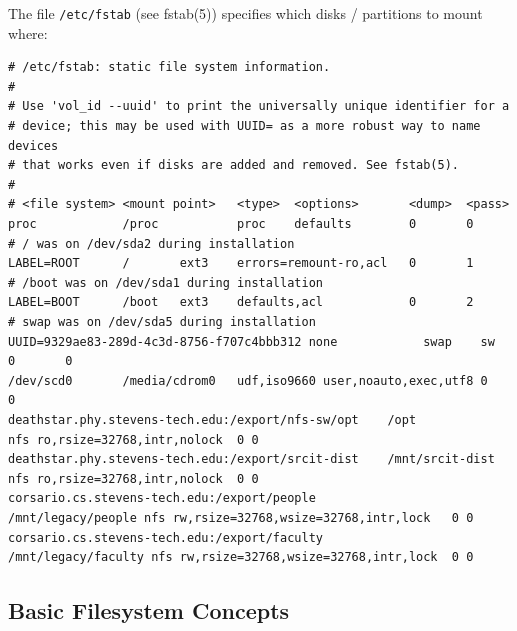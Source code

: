 \documentclass[xga]{xdvislides}
\begin{document}
The file \verb+/etc/fstab+ (see fstab(5)) specifies which disks / partitions
to mount where:
\\
\small
\begin{verbatim}
# /etc/fstab: static file system information.
#
# Use 'vol_id --uuid' to print the universally unique identifier for a
# device; this may be used with UUID= as a more robust way to name devices
# that works even if disks are added and removed. See fstab(5).
#
# <file system> <mount point>   <type>  <options>       <dump>  <pass>
proc            /proc           proc    defaults        0       0
# / was on /dev/sda2 during installation
LABEL=ROOT      /       ext3    errors=remount-ro,acl   0       1
# /boot was on /dev/sda1 during installation
LABEL=BOOT      /boot   ext3    defaults,acl            0       2
# swap was on /dev/sda5 during installation
UUID=9329ae83-289d-4c3d-8756-f707c4bbb312 none            swap    sw
0       0
/dev/scd0       /media/cdrom0   udf,iso9660 user,noauto,exec,utf8 0       0
deathstar.phy.stevens-tech.edu:/export/nfs-sw/opt    /opt            nfs ro,rsize=32768,intr,nolock  0 0
deathstar.phy.stevens-tech.edu:/export/srcit-dist    /mnt/srcit-dist  nfs ro,rsize=32768,intr,nolock  0 0
corsario.cs.stevens-tech.edu:/export/people          /mnt/legacy/people nfs rw,rsize=32768,wsize=32768,intr,lock   0 0
corsario.cs.stevens-tech.edu:/export/faculty         /mnt/legacy/faculty nfs rw,rsize=32768,wsize=32768,intr,lock  0 0

\end{verbatim}
\Normalsize

\subsection{Basic Filesystem Concepts}
\\
\end{document}
